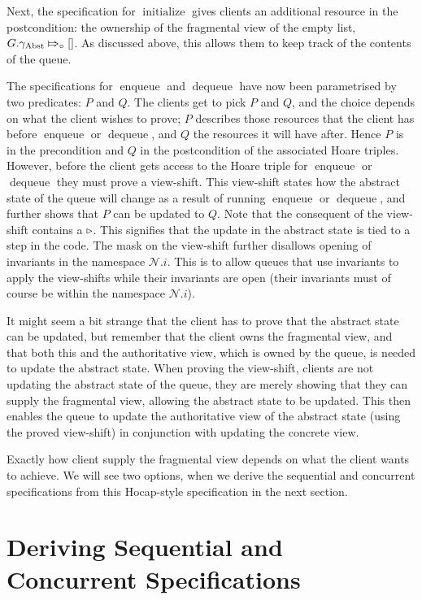 \documentclass[a4paper, 10pt]{report}
\theoremstyle{definition}
\newcommand{\initialise}{\operatorname{initialize}}
\newcommand{\enqueue}{\operatorname{enqueue}}
\newcommand{\dequeue}{\operatorname{dequeue}}
\newcommand{\Qg}{G}
\newcommand{\gabst}{\gname_{\mathrm{Abst}}}
\newcommand{\Nl}{\ensuremath{\mathcal{N}}}
\newcommand{\abstractstatefullfrag}[2]{#1 \Mapsto_{\circ} #2}
\begin{document}
Next, the specification for $\initialise$ gives clients an additional resource in the postcondition: the ownership of the fragmental view of the empty list, $\abstractstatefullfrag{\Qg.\gabst}{[]}$. As discussed above, this allows them to keep track of the contents of the queue.

The specifications for $\enqueue$ and $\dequeue$ have now been parametrised by two predicates: $P$ and $Q$. The clients get to pick $P$ and $Q$, and the choice depends on what the client wishes to prove; $P$ describes those resources that the client has before $\enqueue$ or $\dequeue$, and $Q$ the resources it will have after. Hence $P$ is in the precondition and $Q$ in the postcondition of the associated Hoare triples. However, before the client gets access to the Hoare triple for $\enqueue$ or $\dequeue$ they must prove a view-shift. This view-shift states how the abstract state of the queue will change as a result of running $\enqueue$ or $\dequeue$, and further shows that $P$ can be updated to $Q$. Note that the consequent of the view-shift contains a $\mathop{\triangleright}$. This signifies that the update in the abstract state is tied to a step in the code. The mask on the view-shift further disallows opening of invariants in the namespace $\Nl.i$. This is to allow queues that use invariants to apply the view-shifts while their invariants are open (their invariants must of course be within the namespace $\Nl.i$).

It might seem a bit strange that the client has to prove that the abstract state can be updated, but remember that the client owns the fragmental view, and that both this and the authoritative view, which is owned by the queue, is needed to update the abstract state. When proving the view-shift, clients are not updating the abstract state of the queue, they are merely showing that they can supply the fragmental view, allowing the abstract state to be updated. This then enables the queue to update the authoritative view of the abstract state (using the proved view-shift) in conjunction with updating the concrete view.

Exactly how client supply the fragmental view depends on what the client wants to achieve. We will see two options, when we derive the sequential and concurrent specifications from this Hocap-style specification in the next section.

\section{Deriving Sequential and Concurrent Specifications}
\label{QueueSpecs:section:deriving-seq-and-conc}
\end{document}

